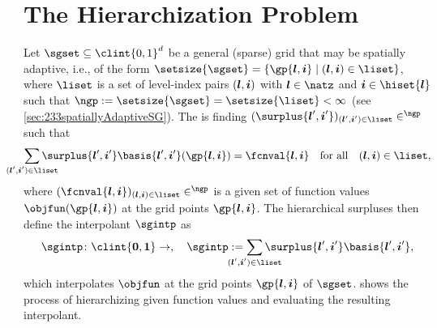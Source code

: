 \section{The Hierarchization Problem}
\label{sec:41problem}

Let $\sgset \subset \clint{0, 1}^d$ be a general (sparse) grid that
may be spatially adaptive, i.e.,
of the form $\setsize{\sgset} = \{\gp{\*l,\*i} \mid (\*l, \*i) \in \liset\}$,
where $\liset$ is a set of level-index pairs $({\boldsymbol{l}}, {\boldsymbol{i}})$ with $\*l \in \natz$
and $\*i \in \hiset{\*l}$ such that
$\ngp := \setsize{\sgset} = \setsize{\liset} < \infty$
(see \cref{sec:233spatiallyAdaptiveSG}).
The  is finding
$(\surplus{\*l',\*i'})_{(\*l',\*i') \in \liset} \in \real^{\ngp}$ such that
\begin{equation}
  \label{eq:hierarchizationProblem}
  \sum_{\mathclap{(\*l', \*i') \in \liset}} \surplus{\*l',\*i'}
  \basis{\*l',\*i'}(\gp{\*l,\*i}) = \fcnval{\*l,\*i}
  \quad\text{for all}\quad
  (\*l, \*i) \in \liset,
\end{equation}
where $(\fcnval{\*l,\*i})_{(\*l,\*i) \in \liset} \in \real^{\ngp}$ is a given set of
function values $\objfun(\gp{\*l,\*i})$ at the grid points $\gp{\*l,\*i}$.
The hierarchical surpluses then define the interpolant $\sgintp$ as
\begin{equation}
  \label{eq:hierarchizationInterpolant}
  \sgintp\colon \clint{\*0, \*1} \to \real,\quad
  \sgintp :=
  \sum_{\mathclap{(\*l', \*i') \in \liset}} \surplus{\*l',\*i'}
  \basis{\*l',\*i'},
\end{equation}
which interpolates $\objfun$ at the grid points $\gp{\*l,\*i}$ of $\sgset$.
 shows the process of hierarchizing given
function values and evaluating the resulting interpolant.

